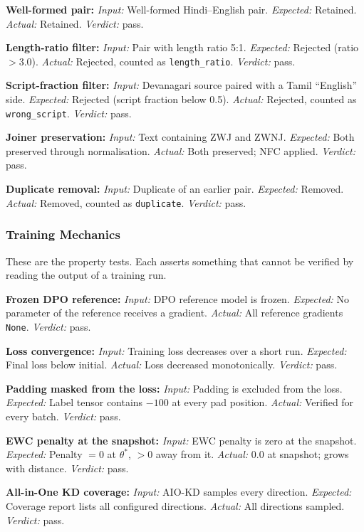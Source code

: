 \begin{bullets}
\item \textbf{Well-formed pair:} \emph{Input:} Well-formed Hindi--English pair. \emph{Expected:} Retained. \emph{Actual:} Retained. \emph{Verdict:} pass.
\item \textbf{Length-ratio filter:} \emph{Input:} Pair with length ratio 5:1. \emph{Expected:} Rejected (ratio $>3.0$). \emph{Actual:} Rejected, counted as \texttt{length\_ratio}. \emph{Verdict:} pass.
\item \textbf{Script-fraction filter:} \emph{Input:} Devanagari source paired with a Tamil ``English'' side. \emph{Expected:} Rejected (script fraction below 0.5). \emph{Actual:} Rejected, counted as \texttt{wrong\_script}. \emph{Verdict:} pass.
\item \textbf{Joiner preservation:} \emph{Input:} Text containing ZWJ and ZWNJ. \emph{Expected:} Both preserved through normalisation. \emph{Actual:} Both preserved; NFC applied. \emph{Verdict:} pass.
\item \textbf{Duplicate removal:} \emph{Input:} Duplicate of an earlier pair. \emph{Expected:} Removed. \emph{Actual:} Removed, counted as \texttt{duplicate}. \emph{Verdict:} pass.
\end{bullets}

\subsubsection{Training Mechanics}

These are the property tests. Each asserts something that cannot be verified by
reading the output of a training run.

\begin{bullets}
\item \textbf{Frozen DPO reference:} \emph{Input:} DPO reference model is frozen. \emph{Expected:} No parameter of the reference receives a gradient. \emph{Actual:} All reference gradients \texttt{None}. \emph{Verdict:} pass.
\item \textbf{Loss convergence:} \emph{Input:} Training loss decreases over a short run. \emph{Expected:} Final loss below initial. \emph{Actual:} Loss decreased monotonically. \emph{Verdict:} pass.
\item \textbf{Padding masked from the loss:} \emph{Input:} Padding is excluded from the loss. \emph{Expected:} Label tensor contains $-100$ at every pad position. \emph{Actual:} Verified for every batch. \emph{Verdict:} pass.
\item \textbf{EWC penalty at the snapshot:} \emph{Input:} EWC penalty is zero at the snapshot. \emph{Expected:} Penalty $= 0$ at $\theta^{*}$, $>0$ away from it. \emph{Actual:} $0.0$ at snapshot; grows with distance. \emph{Verdict:} pass.
\item \textbf{All-in-One KD coverage:} \emph{Input:} AIO-KD samples every direction. \emph{Expected:} Coverage report lists all configured directions. \emph{Actual:} All directions sampled. \emph{Verdict:} pass.
\end{bullets}

